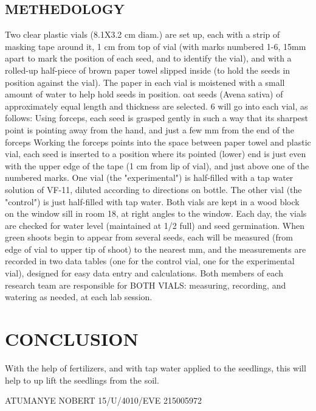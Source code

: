\documentclass[11pt]{book}              %
\begin{document}
\subsection{ METHEDOLOGY}
Two clear plastic vials (8.1X3.2 cm diam.) are set up, each with a strip of masking tape around it, 1 cm from
top of vial (with marks numbered 1-6, 15mm apart to mark the position of each seed, and to identify the
vial), and with a rolled-up half-piece of brown paper towel slipped inside (to hold the seeds in position
against the vial).
           The paper in each vial is moistened with a small amount of water to help hold seeds in position.
oat seeds (Avena sativa) of approximately equal length and thickness are selected. 6 will go into each vial,
as follows:
          Using forceps, each seed is grasped gently in such a way that its sharpest point is pointing away from the
hand, and just a few mm from the end of the forceps
             Working the forceps points into the space between paper towel and plastic vial, each seed is inserted to a position where its pointed (lower) end is just even with the upper edge of the tape (1 cm from lip of vial),
and just above one of the numbered marks. One vial (the "experimental") is half-filled with a tap water solution of VF-11, diluted according to directions
on bottle. The other vial (the "control") is just half-filled with tap water.
       Both vials are kept in a wood block on the window sill in room 18, at right angles to the window.
   Each day, the vials are checked for water level (maintained at 1/2 full) and seed germination.
        When green shoots begin to appear from several seeds, each will be measured (from edge of vial to upper tip of shoot) to the nearest mm, and the measurements are recorded in two data tables (one for the control vial, one for the experimental vial), designed for easy data entry and calculations.
      Both members of each research team are responsible for BOTH VIALS: measuring, recording, and watering
as needed, at each lab session.

\section{CONCLUSION}
With the help of fertilizers, and with tap water applied to the seedlings, this will help to up lift the seedlings from the soil.

                                       ATUMANYE NOBERT
                                       15/U/4010/EVE
                                        215005972
\end{document}
